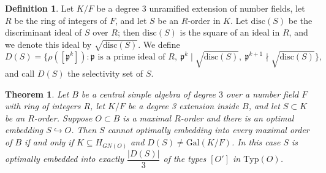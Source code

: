\documentclass[12pt]{article}
\theoremstyle{plain}
\newtheorem{theorem}{Theorem}[section]
\theoremstyle{definition}
\newtheorem{definition}{Definition}[section]
\theoremstyle{remark}
\begin{document}
\begin{definition}
Let $K/F$ be a degree 3 unramified extension of number fields, let $R$ be the ring of integers of $F$, and let $S$ be an $R$-order in $K$. Let $\mathrm{disc}(S)$ be the discriminant ideal of $S$ over $R$; then $\mathrm{disc}(S)$ is the square of an ideal in $R$, and we denote this ideal by $\sqrt{\mathrm{disc}(S)}$. We define
$$D(S) = \{ \rho([\mathfrak{p}^k]) : \mathfrak{p} \text{ is a prime ideal of } R,\ \mathfrak{p}^k \mid \sqrt{\mathrm{disc}(S)},\ \mathfrak{p}^{k+1} \nmid \sqrt{\mathrm{disc}(S)} \},$$
and call $D(S)$ the selectivity set of $S$.
\end{definition}

\begin{theorem}\label{main}
Let $B$ be a central simple algebra of degree $3$ over a number field $F$ with ring of integers $R$, let $K/F$ be a degree 3 extension inside $B$, and let $S\subset K$ be an $R$-order. Suppose $O\subset B$ is a maximal $R$-order and there is an optimal embedding $S\hookrightarrow O$. Then $S$ cannot optimally embedding into every maximal order of $B$ if and only if $K\subseteq H_{GN(O)}$ and $D(S)\neq \mathrm{Gal}(K/F)$. In this case $S$ is optimally embedded into exactly $\dfrac{|D(S)|}{3}$ of the types $[O']$ in $\mathrm{Typ}(O)$.
\end{theorem}
\end{document}
